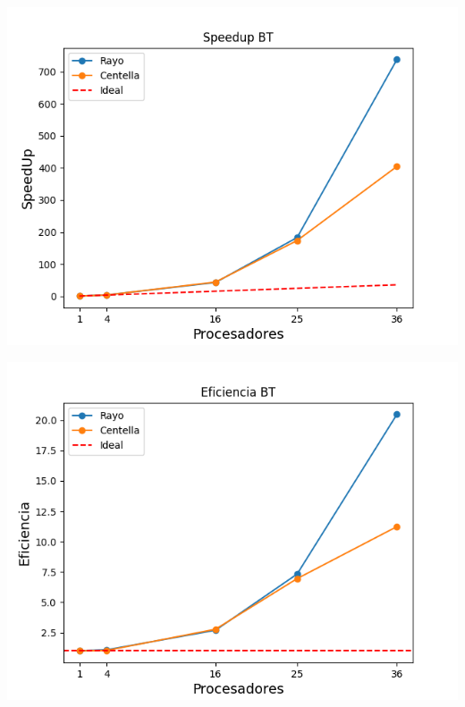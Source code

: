 \begin{center}
 \centering
 \begin{minipage}[b]{.49\textwidth}
  \includegraphics[width=1\linewidth]{plots/speed-up-bt.png}
 \end{minipage}
 \begin{minipage}[b]{.49\textwidth}
  \includegraphics[width=1\linewidth]{plots/efficiency-bt.png}
 \end{minipage}
\end{center}

